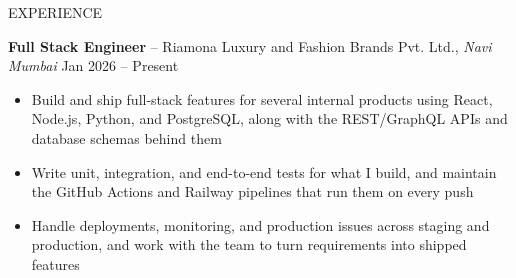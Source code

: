 \documentclass{resume} %
\begin{document}
\begin{rSection}{EXPERIENCE}

\textbf{Full Stack Engineer} -- Riamona Luxury and Fashion Brands Pvt. Ltd., \textit{Navi Mumbai} \hfill {Jan 2026 -- Present}
\begin{itemize}
    \item Build and ship full-stack features for several internal products using React, Node.js, Python, and PostgreSQL, along with the REST/GraphQL APIs and database schemas behind them
    \item Write unit, integration, and end-to-end tests for what I build, and maintain the GitHub Actions and Railway pipelines that run them on every push
    \item Handle deployments, monitoring, and production issues across staging and production, and work with the team to turn requirements into shipped features
\end{itemize}

\end{rSection}

\end{document}
